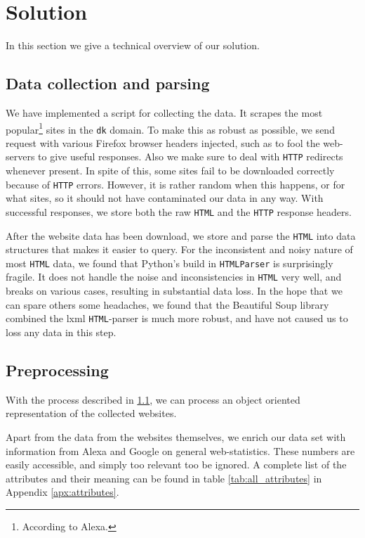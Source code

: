 \section{Solution}
\label{sec:solution}

In this section we give a technical overview of our solution.

\subsection{Data collection and parsing}
\label{subsec:scraping}

We have implemented a script for collecting the data. It scrapes the most popular\footnote{According to Alexa.} sites in the \texttt{dk} domain. To make this as robust as possible, we send request with various Firefox browser headers injected, such as to fool the web-servers to give useful responses. Also we make sure to deal with \texttt{HTTP} redirects whenever present. In spite of this, some sites fail to be downloaded correctly because of \texttt{HTTP} errors. However, it is rather random when this happens, or for what sites, so it should not have contaminated our data in any way. With successful responses, we store both the raw \texttt{HTML} and the \texttt{HTTP} response headers.

After the website data has been download, we store and parse the \texttt{HTML} into data structures that makes it easier to query. For the inconsistent and noisy nature of most \texttt{HTML} data, we found that Python's build in \texttt{HTMLParser} is surprisingly fragile. It does not handle the noise and inconsistencies in \texttt{HTML} very well, and breaks on various cases, resulting in substantial data loss. In the hope that we can spare others some headaches, we found that the Beautiful Soup\cite{beautiful_soup} library combined the lxml\cite{lxml} \texttt{HTML}-parser is much more robust, and have not caused us to loss any data in this step.

\subsection{Preprocessing}
\label{subsec:preprocessing}

With the process described in \ref{subsec:scraping}, we can process an object oriented representation of the collected websites.

Apart from the data from the websites themselves, we enrich our data set with information from Alexa and Google on general web-statistics. These numbers are easily accessible, and simply too relevant too be ignored. A complete list of the attributes and their meaning can be found in table \ref{tab:all_attributes} in Appendix \ref{apx:attributes}.

